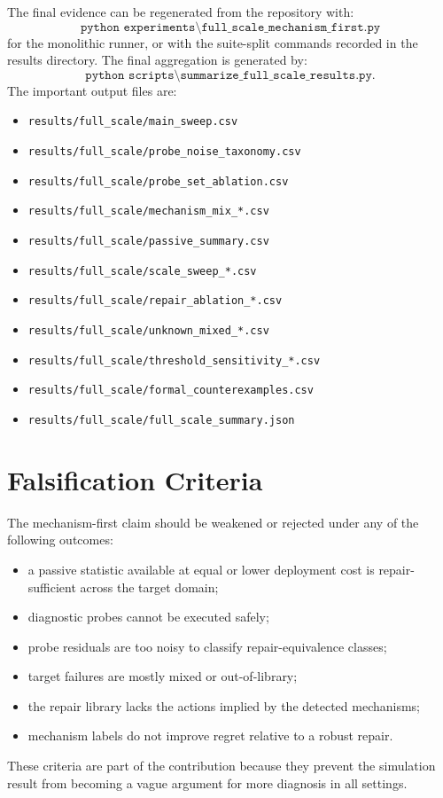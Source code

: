 \documentclass{article}
\begin{document}
The final evidence can be regenerated from the repository with:
\[
\texttt{python experiments\textbackslash full\_scale\_mechanism\_first.py}
\]
for the monolithic runner, or with the suite-split commands recorded in the
results directory. The final aggregation is generated by:
\[
\texttt{python scripts\textbackslash summarize\_full\_scale\_results.py}.
\]
The important output files are:
\begin{itemize}
    \item \texttt{results/full\_scale/main\_sweep.csv}
    \item \texttt{results/full\_scale/probe\_noise\_taxonomy.csv}
    \item \texttt{results/full\_scale/probe\_set\_ablation.csv}
    \item \texttt{results/full\_scale/mechanism\_mix\_*.csv}
    \item \texttt{results/full\_scale/passive\_summary.csv}
    \item \texttt{results/full\_scale/scale\_sweep\_*.csv}
    \item \texttt{results/full\_scale/repair\_ablation\_*.csv}
    \item \texttt{results/full\_scale/unknown\_mixed\_*.csv}
    \item \texttt{results/full\_scale/threshold\_sensitivity\_*.csv}
    \item \texttt{results/full\_scale/formal\_counterexamples.csv}
    \item \texttt{results/full\_scale/full\_scale\_summary.json}
\end{itemize}

\section{Falsification Criteria}

The mechanism-first claim should be weakened or rejected under any of the
following outcomes:
\begin{itemize}
    \item a passive statistic available at equal or lower deployment cost is
    repair-sufficient across the target domain;
    \item diagnostic probes cannot be executed safely;
    \item probe residuals are too noisy to classify repair-equivalence classes;
    \item target failures are mostly mixed or out-of-library;
    \item the repair library lacks the actions implied by the detected
    mechanisms;
    \item mechanism labels do not improve regret relative to a robust repair.
\end{itemize}
These criteria are part of the contribution because they prevent the simulation
result from becoming a vague argument for more diagnosis in all settings.
\end{document}
